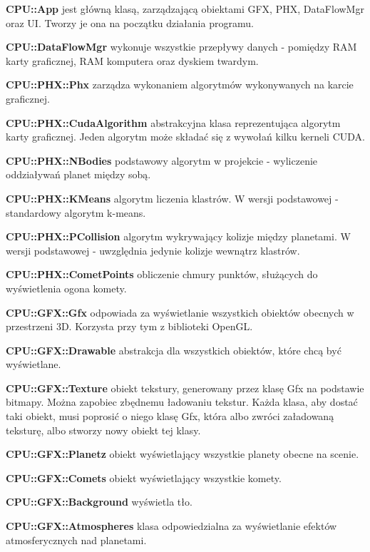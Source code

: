 \begin{description}
\item{\bf CPU::App} jest główną klasą, zarządzającą obiektami GFX, PHX, DataFlowMgr oraz UI. Tworzy je ona na początku działania programu.
\item{\bf CPU::DataFlowMgr} wykonuje wszystkie przepływy danych - pomiędzy RAM karty graficznej, RAM komputera oraz dyskiem twardym.
\item{}
\item{\bf CPU::PHX::Phx} zarządza wykonaniem algorytmów wykonywanych na karcie graficznej.
\item{\bf CPU::PHX::CudaAlgorithm} abstrakcyjna klasa reprezentująca algorytm karty graficznej. Jeden algorytm może składać się z wywołań kilku kerneli CUDA.
\item{\bf CPU::PHX::NBodies} podstawowy algorytm w projekcie - wyliczenie oddziaływań planet między sobą.
\item{\bf CPU::PHX::KMeans} algorytm liczenia klastrów. W wersji podstawowej - standardowy algorytm k-means.
\item{\bf CPU::PHX::PCollision} algorytm wykrywający kolizje między planetami. W wersji podstawowej - uwzględnia jedynie kolizje wewnątrz klastrów.
\item{\bf CPU::PHX::CometPoints} obliczenie chmury punktów, służących do wyświetlenia ogona komety.
\item{}
\item{\bf CPU::GFX::Gfx} odpowiada za wyświetlanie wszystkich obiektów obecnych w przestrzeni 3D. Korzysta przy tym z biblioteki OpenGL.
\item{\bf CPU::GFX::Drawable} abstrakcja dla wszystkich obiektów, które chcą być wyświetlane.
\item{\bf CPU::GFX::Texture} obiekt tekstury, generowany przez klasę Gfx na podstawie bitmapy. Można zapobiec zbędnemu ładowaniu tekstur. Każda klasa, aby dostać taki obiekt, musi poprosić o niego klasę Gfx, która albo zwróci załadowaną teksturę, albo stworzy nowy obiekt tej klasy.
\item{\bf CPU::GFX::Planetz} obiekt wyświetlający wszystkie planety obecne na scenie.
\item{\bf CPU::GFX::Comets} obiekt wyświetlający wszystkie komety.
\item{\bf CPU::GFX::Background} wyświetla tło.
\item{\bf CPU::GFX::Atmospheres} klasa odpowiedzialna za wyświetlanie efektów atmosferycznych nad planetami.
\item{}

\end{description}

